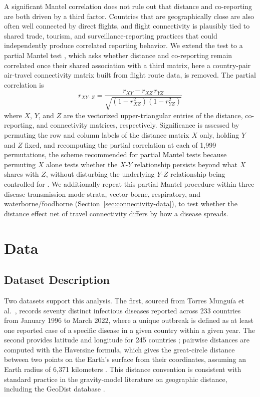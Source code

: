 \documentclass[11pt]{article}
\begin{document}
A significant Mantel correlation does not rule out that distance and co-reporting are both
driven by a third factor. Countries that are geographically close are also often well
connected by direct flights, and flight connectivity is plausibly tied to shared trade,
tourism, and surveillance-reporting practices that could independently produce correlated
reporting behavior. We extend the test to a partial Mantel test \cite{smouse1986}, which
asks whether distance and co-reporting remain correlated once their shared association with
a third matrix, here a country-pair air-travel connectivity matrix built from flight route
data, is removed. The partial correlation is
\begin{equation}
r_{XY \cdot Z} = \frac{r_{XY} - r_{XZ}\,r_{YZ}}{\sqrt{(1-r_{XZ}^2)(1-r_{YZ}^2)}}
\label{eq:partial}
\end{equation}
where $X$, $Y$, and $Z$ are the vectorized upper-triangular entries of the distance,
co-reporting, and connectivity matrices, respectively. Significance is assessed by
permuting the row and column labels of the distance matrix $X$ only, holding $Y$ and $Z$
fixed, and recomputing the partial correlation at each of 1{,}999 permutations, the scheme
recommended for partial Mantel tests because permuting $X$ alone tests whether the $X$-$Y$
relationship persists beyond what $X$ shares with $Z$, without disturbing the underlying
$Y$-$Z$ relationship being controlled for \cite{legendre2000}. We additionally repeat this
partial Mantel procedure within three disease transmission-mode strata, vector-borne,
respiratory, and waterborne/foodborne (Section~\ref{sec:connectivity-data}), to test whether
the distance effect net of travel connectivity differs by how a disease spreads.

\FloatBarrier

\section{Data}

\subsection{Dataset Description}

Two datasets support this analysis. The first, sourced from Torres Mungu\'{i}a et
al.~\cite{torres2022}, records seventy distinct infectious diseases reported across 233
countries from January 1996 to March 2022, where a unique outbreak is defined as at least
one reported case of a specific disease in a given country within a given year. The second
provides latitude and longitude for 245 countries \cite{metal3d2024}; pairwise distances are
computed with the Haversine formula, which gives the great-circle distance between two
points on the Earth's surface from their coordinates, assuming an Earth radius of 6{,}371
kilometers \cite{haversine2024}. This distance convention is consistent with standard
practice in the gravity-model literature on geographic distance, including the GeoDist
database \cite{mayer2011}.
\end{document}
